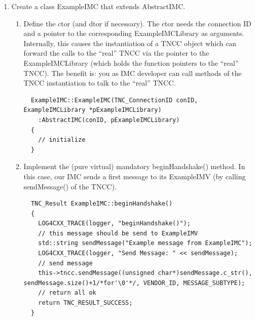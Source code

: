 \documentclass[a4paper,10pt]{scrartcl}
\begin{document}
\begin{enumerate}
 \item Create a class ExampleIMC that extends AbstractIMC.
 \begin{enumerate}
  \item Define the ctor (and dtor if necessary). The ctor needs the connection ID and a pointer to the
  corresponding ExampleIMCLibrary as arguments. Internally, this causes the instantiation of a TNCC object
  which can forward the calls to the ``real'' TNCC via the pointer to the ExampleIMCLibrary (which holds the
  function pointers to the ``real'' TNCC). The benefit is: you as IMC developer can call methods of the TNCC
  instantiation to talk to the ``real'' TNCC.
  \begin{lstlisting}
  ExampleIMC::ExampleIMC(TNC_ConnectionID conID, ExampleIMCLibrary *pExampleIMCLibrary)
    :AbstractIMC(conID, pExampleIMCLibrary)
  {
    // initialize
  }
  \end{lstlisting}

  \item Implement the (pure virtual) mandatory beginHandshake() method. In this case, our IMC sends a first message
  to its ExampleIMV (by calling sendMessage() of the TNCC).
  \begin{lstlisting}
  TNC_Result ExampleIMC::beginHandshake()
  {
    LOG4CXX_TRACE(logger, "beginHandshake()");
    // this message should be send to ExampleIMV
    std::string sendMessage("Example message from ExampleIMC");
    LOG4CXX_TRACE(logger, "Send Message: " << sendMessage);
    // send message
    this->tncc.sendMessage((unsigned char*)sendMessage.c_str(), sendMessage.size()+1/*for'\0'*/, VENDOR_ID, MESSAGE_SUBTYPE);
    // return all ok
    return TNC_RESULT_SUCCESS;
  }
  \end{lstlisting}


\end{enumerate}
\end{enumerate}
\end{document}
